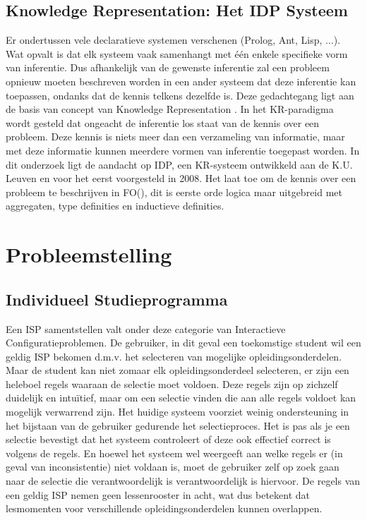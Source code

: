 \subsection{Knowledge Representation: Het IDP Systeem}
Er ondertussen vele declaratieve systemen verschenen (Prolog, Ant, Lisp, ...). Wat opvalt is dat elk systeem vaak samenhangt met \'{e}\'{e}n enkele specifieke vorm van inferentie. Dus afhankelijk van de gewenste inferentie zal een probleem opnieuw moeten beschreven worden in een ander systeem dat deze inferentie kan toepassen, ondanks dat de kennis telkens dezelfde is. Deze gedachtegang ligt aan de basis van concept van Knowledge Representation \citep{denecker2008building}. In het KR-paradigma wordt gesteld dat ongeacht de inferentie los staat van de kennis over een probleem. Deze kennis is niets meer dan een verzameling van informatie, maar met deze informatie kunnen meerdere vormen van inferentie toegepast worden. In dit onderzoek ligt de aandacht op IDP, een KR-systeem ontwikkeld aan de K.U. Leuven en voor het eerst voorgesteld in 2008. Het laat toe om de kennis over een probleem te beschrijven in FO(\textperiodcentered), dit is eerste orde logica maar uitgebreid met aggregaten, type definities en inductieve definities. 

\section{Probleemstelling}

\subsection{Individueel Studieprogramma}
Een ISP samentstellen valt onder deze categorie van Interactieve Configuratieproblemen. De gebruiker, in dit geval een toekomstige student wil een geldig ISP bekomen d.m.v. het selecteren van mogelijke opleidingsonderdelen. Maar de student kan niet zomaar elk opleidingsonderdeel selecteren, er zijn een heleboel regels waaraan de selectie moet voldoen. Deze regels zijn op zichzelf duidelijk en intu\"{i}tief, maar om een selectie vinden die aan alle regels voldoet kan mogelijk verwarrend zijn. Het huidige systeem voorziet weinig ondersteuning in het bijstaan van de gebruiker gedurende het selectieproces. Het is pas als je een selectie bevestigt dat het systeem controleert of deze ook effectief correct is volgens de regels. En hoewel het systeem wel weergeeft aan welke regels er (in geval van inconsistentie) niet voldaan is, moet de gebruiker zelf op zoek gaan naar de selectie die verantwoordelijk is verantwoordelijk is hiervoor. De regels van een geldig ISP nemen geen lessenrooster in acht, wat dus betekent dat lesmomenten voor verschillende opleidingsonderdelen kunnen overlappen. 

